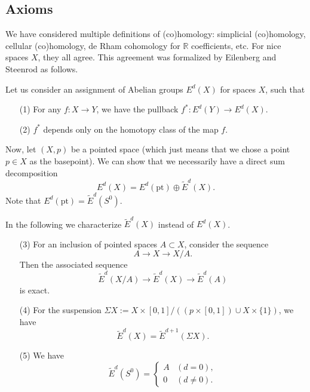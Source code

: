 \documentclass[12pt]{article}
\numberwithin{equation}{section}
\numberwithin{figure}{section}
\theoremstyle{remark}
\def\bR{\mathbb{R}}
\def\pt{\mathrm{pt}}
\begin{document}
\subsection{Axioms}

We have considered multiple definitions of (co)homology: simplicial (co)\-homology, cellular (co)\-homology, de Rham co\-homology for $\bR$ coefficients, etc. 
For nice spaces $X$, they all agree. This agreement was formalized by Eilenberg and Steenrod as follows. 

Let us consider an assignment of Abelian groups $E^d(X)$ for spaces $X$, such that
\begin{enumerate}
\item[(1)] For any $f:X\to Y$, we have the pullback $f^*: E^d(Y)\to E^d(X)$. 
\item[(2)] $f^*$ depends only on the homotopy class of the map $f$.
\end{enumerate}

Now, let $(X,p)$ be a pointed space (which just means that we chose a point $p\in X$ as the basepoint).
We can show that we necessarily have a direct sum decomposition \begin{equation}
E^d(X)=E^d(\pt) \oplus \tilde E^d(X).
\end{equation} 
Note that $E^d(\pt)=\tilde E^d(S^0)$.

In the following we characterize $\tilde E^d(X)$ instead of $E^d(X)$.
\begin{enumerate}
\item[(3)] For an inclusion of pointed spaces $A\subset X$, consider the sequence \begin{equation}
A\to X\to X/A.
\end{equation} Then the associated sequence \begin{equation}
\tilde E^d(X/A) \to \tilde E^d(X)\to \tilde E^d(A)
\end{equation} is exact.
\item[(4)] For the suspension $\Sigma X := X\times [0,1] / ( (p\times [0,1]) \cup X\times \{1\})$, we have \begin{equation}
\tilde E^d(X)=\tilde E^{d+1}(\Sigma X).
\end{equation}
\item[(5)] We have \begin{equation}
\tilde E^d(S^0) = \begin{cases}
A & (d=0),\\
0 & (d\neq 0).
\end{cases}
\end{equation}
\end{enumerate}
\end{document}
